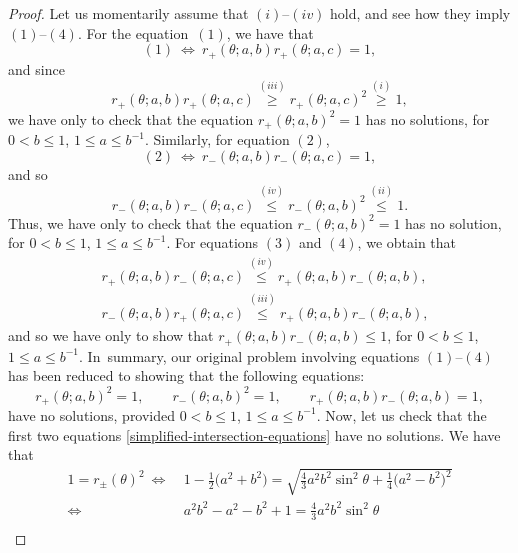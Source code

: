 \documentclass[10pt,a4paper]{amsart}
\numberwithin{equation}{section}
\begin{document}
\begin{proof}
Let us momentarily assume that $(i)$--$(iv)$ hold, and see how they imply $(1)$--$(4)$. For the equation~$(1)$, we have that
 \begin{equation*}
 (1) \ \Longleftrightarrow \ r_{+}(\theta;a,b)r_{+}(\theta;a,c) = 1,
 \end{equation*}
and since
 \begin{equation*}
 r_{+}(\theta;a,b)r_{+}(\theta;a,c) \overset{(iii)}{\geq} r_{+}(\theta;a,c)^2 \overset{(i)}{\geq} 1,
 \end{equation*}
we have only to check that the equation $r_{+}(\theta;a,b)^2 = 1$ has no solutions, for $0< b \leq 1$, $1 \leq a \leq b^{-1}$.
Similarly, for equation $(2)$,
 \begin{equation*}
 (2) \ \Longleftrightarrow \ r_{-}(\theta;a,b)r_{-}(\theta;a,c) = 1,
 \end{equation*}
and so
 \begin{equation*}
 r_{-}(\theta;a,b)r_{-}(\theta;a,c) \overset{(iv)}{\leq} r_{-}(\theta;a,b)^2 \overset{(ii)}{\leq} 1.
 \end{equation*}
 Thus, we have only to check that the equation $r_{-}(\theta;a,b)^2 = 1$ has no solution, for $0< b \leq 1$, $1 \leq a \leq b^{-1}$.
 For equations $(3)$ and $(4)$, we obtain that
 \begin{align*}
 &r_+(\theta;a,b)r_-(\theta;a,c)\overset{(iv)}{\leq} r_+(\theta;a,b) r_-(\theta;a,b),\\
 &r_{-}(\theta;a,b)r_+(\theta;a,c)\overset{(iii)}{\leq} r_+(\theta;a,b) r_-(\theta;a,b),
 \end{align*}
and so we have only to show that $r_+(\theta;a,b) r_-(\theta;a,b) \leq 1$, for $0< b \leq 1$, $1 \leq a \leq b^{-1}$. In~summary, our original problem involving equations $(1)$--$(4)$ has been reduced to showing that the following equations:
 \begin{equation}\label{simplified-intersection-equations}
 r_+(\theta;a,b)^2 = 1, \qquad r_-(\theta;a,b)^2 = 1,\qquad r_+(\theta;a,b)r_-(\theta;a,b) = 1,
 \end{equation}
have no solutions, provided $0< b \leq 1$, $1 \leq a \leq b^{-1}$.
Now, let us check that the first two equations \eqref{simplified-intersection-equations} have no solutions. We have that
 \begin{align*}
 1 =r_{\pm}(\theta)^2 \ \Longleftrightarrow \ {}& 1-\frac{1}{2}\bigl(a^2+b^2\bigr) = \sqrt{\frac{4}{3} a^2b^2 \sin^2\theta + \frac{1}{4}\bigl(a^2-b^2\bigr)^2}\\
 \Longleftrightarrow \ {}& a^2b^2- a^2 -b^2 + 1 = \frac{4}{3} a^2b^2 \sin^2\theta\\

\end{align*}
\end{proof}
\end{document}
